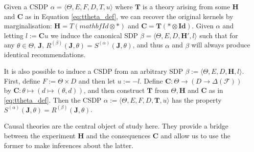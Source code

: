 Given a CSDP $\alpha = \langle \Theta, E, F, D, T, u\rangle$ where $\mathbf{T}$ is a theory arising from some $\mathbf{H}$ and $\mathbf{C}$ as in Equation \ref{eq:ttheta_def}, we can recover the original kernels by marginalisation: $\mathbf{H}= T(mathbf{Id}\otimes *)$ and $\mathbf{C}=\mathbf{T}(*\otimes \mathbf{Id})$. Given $\alpha$ and letting $l:= \mathbf{C}u$ we induce the canonical SDP $\beta=\langle \Theta, E, D, \mathbf{H}', l\rangle$ such that for any $\theta\in \Theta$, $\mathbf{J}$, $R^{(\beta)}(\mathbf{J},\theta) = S^{(\alpha)}(\mathbf{J},\theta)$, and thus $\alpha$ and $\beta$ will always produce identical recommendations.

It is also possible to induce a CSDP from an arbitrary SDP $\beta:=\langle \Theta, E, D, \mathbf{H}, l\rangle$. First, define $F:=\Theta\times D$ and then let $u:=-l$. Define $\mathbf{C}:\Theta\to (D\to \Delta(\mathcal{F}))$ by $\mathbf{C}:\theta\mapsto (d\mapsto (\theta,d))$, and then construct $\mathbf{T}$ from $\Theta, \mathbf{H}$ and $\mathbf{C}$ as in \ref{eq:ttheta_def}. Then the CSDP $\alpha:=\langle \Theta, E, F, D, \mathbf{T}, u\rangle$ has the property $S^{(\alpha)}(\mathbf{J}, \theta) = R^{(\beta)}(\mathbf{J},\theta)$.

Causal theories are the central object of study here. They provide a bridge between the experiment $\mathbf{H}$ and the consequences $\mathbf{C}$ and allow us to use the former to make inferences about the latter. 